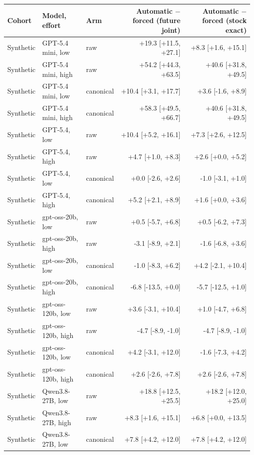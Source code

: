 \begin{table}[htbp]
\centering\scriptsize
\setlength{\tabcolsep}{3pt}
\begin{tabular}{lllrr}
\toprule
Cohort & Model, effort & Arm & Automatic $-$ forced (future joint) & Automatic $-$ forced (stock exact) \\
\midrule
Synthetic & GPT-5.4 mini, low & raw & +19.3 [+11.5, +27.1] & +8.3 [+1.6, +15.1] \\
Synthetic & GPT-5.4 mini, high & raw & +54.2 [+44.3, +63.5] & +40.6 [+31.8, +49.5] \\
Synthetic & GPT-5.4 mini, low & canonical & +10.4 [+3.1, +17.7] & +3.6 [-1.6, +8.9] \\
Synthetic & GPT-5.4 mini, high & canonical & +58.3 [+49.5, +66.7] & +40.6 [+31.8, +49.5] \\
Synthetic & GPT-5.4, low & raw & +10.4 [+5.2, +16.1] & +7.3 [+2.6, +12.5] \\
Synthetic & GPT-5.4, high & raw & +4.7 [+1.0, +8.3] & +2.6 [+0.0, +5.2] \\
Synthetic & GPT-5.4, low & canonical & +0.0 [-2.6, +2.6] & -1.0 [-3.1, +1.0] \\
Synthetic & GPT-5.4, high & canonical & +5.2 [+2.1, +8.9] & +1.6 [+0.0, +3.6] \\
Synthetic & gpt-oss-20b, low & raw & +0.5 [-5.7, +6.8] & +0.5 [-6.2, +7.3] \\
Synthetic & gpt-oss-20b, high & raw & -3.1 [-8.9, +2.1] & -1.6 [-6.8, +3.6] \\
Synthetic & gpt-oss-20b, low & canonical & -1.0 [-8.3, +6.2] & +4.2 [-2.1, +10.4] \\
Synthetic & gpt-oss-20b, high & canonical & -6.8 [-13.5, +0.0] & -5.7 [-12.5, +1.0] \\
Synthetic & gpt-oss-120b, low & raw & +3.6 [-3.1, +10.4] & +1.0 [-4.7, +6.8] \\
Synthetic & gpt-oss-120b, high & raw & -4.7 [-8.9, -1.0] & -4.7 [-8.9, -1.0] \\
Synthetic & gpt-oss-120b, low & canonical & +4.2 [-3.1, +12.0] & -1.6 [-7.3, +4.2] \\
Synthetic & gpt-oss-120b, high & canonical & +2.6 [-2.6, +7.8] & +2.6 [-2.6, +7.8] \\
Synthetic & Qwen3.8-27B, low & raw & +18.8 [+12.5, +25.5] & +18.2 [+12.0, +25.0] \\
Synthetic & Qwen3.8-27B, high & raw & +8.3 [+1.6, +15.1] & +6.8 [+0.0, +13.5] \\
Synthetic & Qwen3.8-27B, low & canonical & +7.8 [+4.2, +12.0] & +7.8 [+4.2, +12.0] \\

\end{tabular}
\end{table}
